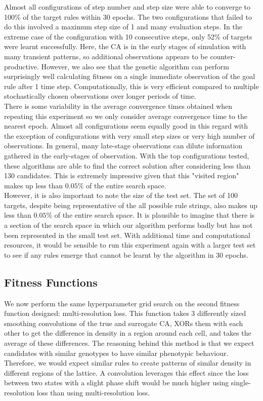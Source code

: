 Almost all configurations of step number and step size were able to converge to 100\% of the target rules within 30 epochs. The two configurations that failed to do this involved a maximum step size of 1 and many evaluation steps. In the extreme case of the configuration with 10 consecutive steps, only 52\% of targets were learnt successfully. Here, the CA is in the early stages of simulation with many transient patterns, so additional observations appears to be counter-productive. However, we also see that the genetic algorithm can perform surprisingly well calculating fitness on a single immediate observation of the goal rule after 1 time step. Computationally, this is very efficient compared to multiple stochastically chosen observations over longer periods of time. \\

There is some variability in the average convergence times obtained when repeating this experiment so we only consider average convergence time to the nearest epoch. Almost all configurations seem equally good in this regard with the exception of configurations with very small step sizes or very high number of observations. In general, many late-stage observations can dilute information gathered in the early-stages of observation. With the top configurations tested, these algorithms are able to find the correct solution after considering less than 130 candidates. This is extremely impressive given that this "visited region" makes up less than $0.05\%$ of the entire search space.\\

However, it is also important to note the size of the test set. The set of 100 targets, despite being representative of the all possible rule strings, also makes up less than $0.05\%$ of the entire search space. It is plausible to imagine that there is a section of the search space in which our algorithm performs badly but has not been represented in the small test set. With additional time and computational resources, it would be sensible to run this experiment again with a larger test set to see if any rules emerge that cannot be learnt by the algorithm in 30 epochs.

\subsection{Fitness Functions}

We now perform the same hyperparameter grid search on the second fitness function designed: multi-resolution loss. This function takes 3 differently sized smoothing convolutions of the true and surrogate CA, XORs them with each other to get the difference in density in a region around each cell, and takes the average of these differences. The reasoning behind this method is that we expect candidates with similar genotypes to have similar phenotypic behaviour. Therefore, we would expect similar rules to create patterns of similar density in different regions of the lattice. A convolution leverages this effect since the loss between two states with a slight phase shift would be much higher using single-resolution loss than using multi-resolution loss.\\

